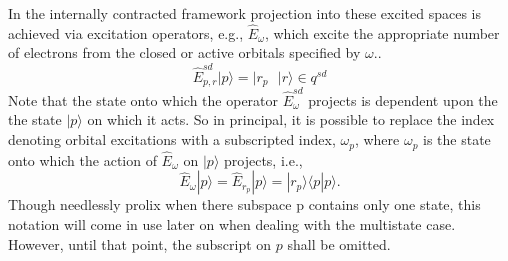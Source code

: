 \documentclass[12pt]{article}
\begin{document}
\noindent In the internally contracted framework projection into these excited spaces is achieved via excitation operators, e.g., $\hat{E}_{\omega}$,
which excite the appropriate number of electrons from the closed or active orbitals specified by $\omega$.. 
\begin{equation}
\hat{E}^{sd}_{p,r}|p\rangle = |r_{p}  \text{ \ \ \ \ } |r\rangle \in q^{sd} 
\end{equation}
Note that the state onto which the operator $\hat{E}^{sd}_{\omega}$ projects is dependent upon the
the state $|p\rangle $  on which it acts. So in principal, it is possible to replace the index denoting 
orbital excitations with a subscripted index, $\omega_{p}$, where $\omega_{p}$ is the state onto which
the action of $\hat{E}_{\omega}$ on $|p\rangle$ projects, i.e.,
\begin{equation}
\hat{E}_{\omega} |p\rangle = 
\hat{E}_{r_{p}} |p\rangle = | r_{p} \rangle \langle p | p \rangle .
\end{equation}
Though needlessly prolix when there subspace $\mathrm{p}$ contains only one state, this notation will
come in use later on when dealing with the multistate case. However, until that point, the subscript on $p$
shall be omitted.\\
\end{document}
